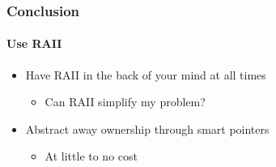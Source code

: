 \begin{frame}
    \frametitle{Conclusion}
    \framesubtitle{Use RAII}
    \begin{itemize}
        \item<1->Have RAII in the back of your mind at all times
            \begin{itemize}
                \item Can RAII simplify my problem?
            \end{itemize}
        \item<1->Abstract away ownership through smart pointers
            \begin{itemize}
                \item At little to no cost
            \end{itemize}
    \end{itemize}
\end{frame}




